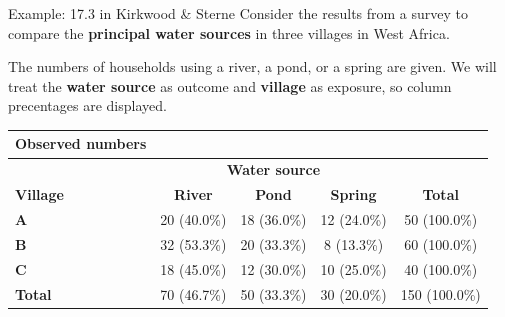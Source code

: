\documentclass[compress, notes=hide]{beamer}
\newcommand{\hl}[1]{\textbf{#1}}
\begin{document}
\begin{frame}
\begin{block}{Example: 17.3 in Kirkwood \& Sterne}
  Consider the results from a survey to compare the \hl{principal
    water sources} in three villages in West Africa. 

The numbers of
  households using a river, a pond, or a spring are given. We will
  treat the \hl{water source} as outcome and \hl{village} as
  exposure, so column precentages are displayed.
\begin{table}
\begin{footnotesize}
\begin{tabular}{lcccc}
Observed numbers & & & &
\\
\hline
& \multicolumn{3}{c}{\textbf{Water source}} &
\\
\cline{2-4}
\textbf{Village} & \textbf{River} & \textbf{Pond} & \textbf{Spring} & \textbf{Total}
\\
\hline
\textbf{A} & 20 (40.0\%) & 18 (36.0\%) & 12 (24.0\%) & 50 (100.0\%)
\\
\textbf{B} & 32 (53.3\%) & 20 (33.3\%) & 8 (13.3\%) & 60 (100.0\%)
\\
\textbf{C} & 18 (45.0\%) & 12 (30.0\%) & 10 (25.0\%) & 40 (100.0\%)
\\
\hline
\textbf{Total} & 70 (46.7\%) & 50 (33.3\%) & 30 (20.0\%) & 150 (100.0\%)
\\
\hline
\end{tabular}
\end{footnotesize}
\end{table}
\end{block}
\end{frame}
\end{document}
